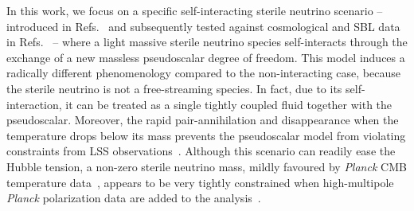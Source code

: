 \documentclass[a4paper,11pt]{article}
\begin{document}
In this work, we focus on a specific self-interacting sterile neutrino scenario -- introduced in Refs.~\cite{Archidiacono:2014nda,Archidiacono:2015oma} and subsequently tested against cosmological and SBL data in Refs.~\cite{Archidiacono:2016kkh,Archidiacono:2020yey} -- where a light massive sterile neutrino species self-interacts through the exchange of a new massless pseudoscalar degree of freedom.
This model induces a radically different phenomenology compared to the non-interacting case, because the sterile neutrino is not a free-streaming species.
In fact, due to its self-interaction, it can be treated as a single tightly coupled fluid
{together with the pseudoscalar}.
Moreover, the rapid pair-annihilation and disappearance when the temperature drops below its mass prevents the pseudoscalar model from violating constraints from LSS observations~\cite{Archidiacono:2014nda,Archidiacono:2015oma}.
Although this scenario can readily ease the Hubble tension, a non-zero sterile neutrino mass, mildly favoured by \emph{Planck} CMB temperature data~\cite{Archidiacono:2016kkh}, appears to be very tightly constrained when high-multipole \emph{Planck} polarization data are added to the analysis~\cite{Archidiacono:2020yey}.
\end{document}
